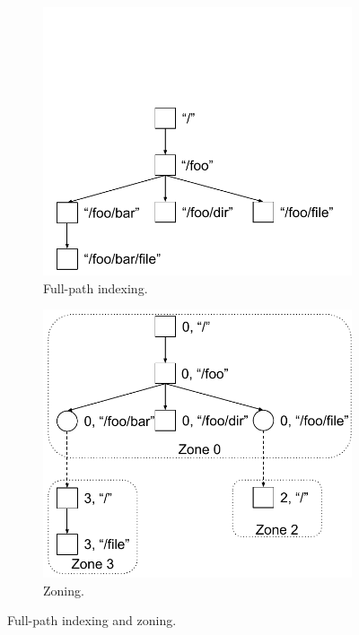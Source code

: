 \begin{figure}
  \begin{subfigure}{.5\textwidth}
    \centering
    \includegraphics[width=.9\linewidth]{fig/FPI}
    \caption{\label{subfig:FPI} Full-path indexing.}
  \end{subfigure}
  \begin{subfigure}{.5\textwidth}
    \centering
    \includegraphics[width=.9\linewidth]{fig/RPI}
    \caption{\label{subfig:RPI} Zoning.}
  \end{subfigure}
  \caption{\label{fig:zoning} Full-path indexing and zoning.}
\end{figure}

